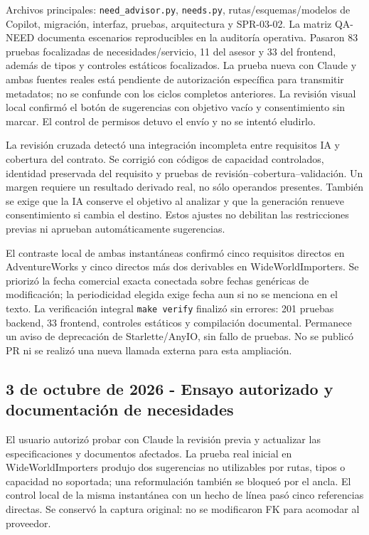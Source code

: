 \documentclass[11pt,letterpaper]{article}
\newcommand{\file}[1]{\texttt{#1}}
\begin{document}
Archivos principales: \file{need\_advisor.py}, \file{needs.py}, rutas/esquemas/modelos
de Copilot, migración, interfaz, pruebas, arquitectura y SPR-03-02. La matriz
QA-NEED documenta escenarios reproducibles en la auditoría operativa. Pasaron
83 pruebas focalizadas de necesidades/servicio, 11 del asesor y 33 del frontend,
además de tipos y controles estáticos focalizados. La prueba nueva con Claude y
ambas fuentes reales está pendiente de autorización específica para transmitir
metadatos; no se confunde con los ciclos completos anteriores. La revisión visual
local confirmó el botón de sugerencias con objetivo vacío y consentimiento sin
marcar. El control de permisos detuvo el envío y no se intentó eludirlo.

La revisión cruzada detectó una integración incompleta entre requisitos IA y
cobertura del contrato. Se corrigió con códigos de capacidad controlados,
identidad preservada del requisito y pruebas de revisión--cobertura--validación.
Un margen requiere un resultado derivado real, no sólo operandos presentes.
También se exige que la IA conserve el objetivo al analizar y que la generación
renueve consentimiento si cambia el destino. Estos ajustes no debilitan las
restricciones previas ni aprueban automáticamente sugerencias.

El contraste local de ambas instantáneas confirmó cinco requisitos directos en
AdventureWorks y cinco directos más dos derivables en WideWorldImporters. Se
priorizó la fecha comercial exacta conectada sobre fechas genéricas de modificación;
la periodicidad elegida exige fecha aun si no se menciona en el texto.
La verificación integral \file{make verify} finalizó sin errores: 201 pruebas
backend, 33 frontend, controles estáticos y compilación documental. Permanece un
aviso de deprecación de Starlette/AnyIO, sin fallo de pruebas. No se publicó PR ni
se realizó una nueva llamada externa para esta ampliación.

\subsection{3 de octubre de 2026 - Ensayo autorizado y documentación de necesidades}

El usuario autorizó probar con Claude la revisión previa y actualizar las
especificaciones y documentos afectados. La prueba real inicial en WideWorldImporters
produjo dos sugerencias no utilizables por rutas, tipos o capacidad no soportada;
una reformulación también se bloqueó por el ancla. El control local de la misma
instantánea con un hecho de línea pasó cinco referencias directas. Se conservó la
captura original: no se modificaron FK para acomodar al proveedor.
\end{document}
